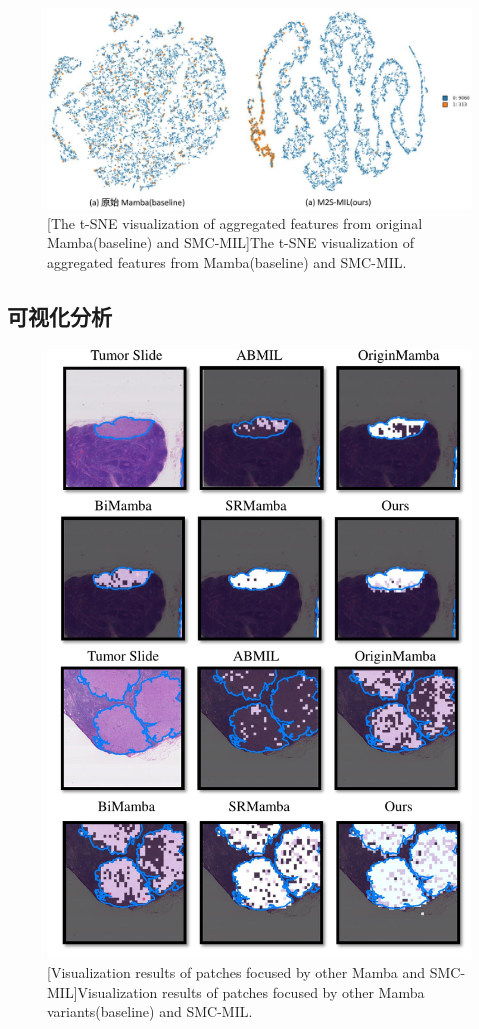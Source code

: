 \begin{figure}[ht]
  \centering
  \includegraphics[width=1.0\columnwidth]{figures/vis2_2.pdf}
  [The t-SNE visualization of aggregated features from original Mamba(baseline) and SMC-MIL]{The t-SNE visualization of aggregated features from Mamba(baseline) and SMC-MIL.}
  \label{figure3: tSNE}
\end{figure}

\subsection[\hspace{-2pt}可视化分析]{{\heiti{} \hspace{-8pt}可视化分析}}\label{section3: 可视化分析}
\begin{figure}[h!]
  \centering
  \includegraphics[width=0.7\columnwidth]{figures/vis2.pdf}
  [Visualization results of patches focused by other Mamba and SMC-MIL]{Visualization results of patches focused by other Mamba variants(baseline) and SMC-MIL.}
  \label{figure3: visualize}
\end{figure}

